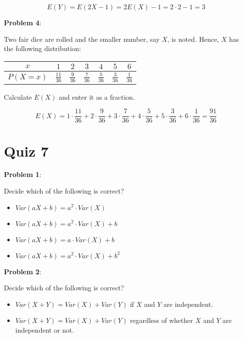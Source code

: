 \documentclass{article}
\begin{document}
{\color{blue}

\[E(Y)=E(2X-1)=2E(X)-1=2\cdot2-1=3\]

}

\noindent\textbf{Problem 4}:

Two fair dice are rolled and the smaller number, say $X$, is noted. Hence, $X$ has the following distribution:

\begin{center}
    \begin{tabular}{|c|c|c|c|c|c|c|}
        \hline
        $x$&$1$&$2$&$3$&$4$&$5$&$6$\\
        \hline
        $P(X=x)$&$\frac{11}{36}$&$\frac{9}{36}$&$\frac{7}{36}$&$\frac{5}{36}$&$\frac{3}{36}$&$\frac{1}{36}$\\
        \hline
    \end{tabular}
\end{center}

Calculate $E(X)$ and enter it as a fraction.

{\color{blue}

\[E(X)=1\cdot\frac{11}{36}+2\cdot\frac{9}{36}+3\cdot\frac{7}{36}+4\cdot\frac{5}{36}+5\cdot\frac{3}{36}+6\cdot\frac{1}{36}=\frac{91}{36}\]

}

\section{Quiz 7}

\noindent\textbf{Problem 1}:

Decide which of the following is correct?

\begin{itemize}
    \item {\color{blue}$Var(aX+b)=a^2\cdot Var(X)$}
    \item $Var(aX+b)=a^2\cdot Var(X)+b$
    \item $Var(aX+b)=a\cdot Var(X)+b$
    \item $Var(aX+b)=a^2\cdot Var(X)+b^2$
\end{itemize}

\noindent\textbf{Problem 2}:

Decide which of the following is correct?

\begin{itemize}
    \item {\color{blue}$Var(X+Y)=Var(X)+Var(Y)$ if $X$ and $Y$ are independent.}
    \item $Var(X+Y)=Var(X)+Var(Y)$ regardless of whether $X$ and $Y$ are independent or not.
\end{itemize}
\end{document}
